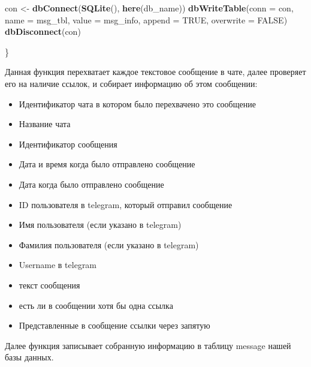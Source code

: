 \documentclass[
]{book}
\newenvironment{Shaded}{\begin{snugshade}}{\end{snugshade}}
\newcommand{\AttributeTok}[1]{\textcolor[rgb]{0.13,0.29,0.53}{#1}}
\newcommand{\ConstantTok}[1]{\textcolor[rgb]{0.56,0.35,0.01}{#1}}
\newcommand{\FunctionTok}[1]{\textcolor[rgb]{0.13,0.29,0.53}{\textbf{#1}}}
\newcommand{\NormalTok}[1]{#1}
\newcommand{\OtherTok}[1]{\textcolor[rgb]{0.56,0.35,0.01}{#1}}
\providecommand{\tightlist}{%
  \setlength{\itemsep}{0pt}\setlength{\parskip}{0pt}}
\begin{document}
\begin{Shaded}
\begin{Highlighting}[]
\NormalTok{  con }\OtherTok{\textless{}{-}} \FunctionTok{dbConnect}\NormalTok{(}\FunctionTok{SQLite}\NormalTok{(), }\FunctionTok{here}\NormalTok{(db\_name))}
  \FunctionTok{dbWriteTable}\NormalTok{(}\AttributeTok{conn =}\NormalTok{ con, }\AttributeTok{name =}\NormalTok{ msg\_tbl, }\AttributeTok{value =}\NormalTok{ msg\_info, }\AttributeTok{append =} \ConstantTok{TRUE}\NormalTok{, }\AttributeTok{overwrite =} \ConstantTok{FALSE}\NormalTok{)}
  \FunctionTok{dbDisconnect}\NormalTok{(con)}
  
\NormalTok{\}}
\end{Highlighting}
\end{Shaded}

Данная функция перехватает каждое текстовое сообщение в чате, далее проверяет его на наличие ссылок, и собирает информацию об этом сообщении:

\begin{itemize}
\tightlist
\item
  Идентификатор чата в котором было перехвачено это сообщение
\item
  Название чата
\item
  Идентификатор сообщения
\item
  Дата и время когда было отправлено сообщение
\item
  Дата когда было отправлено сообщение
\item
  ID пользователя в telegram, который отправил сообщение
\item
  Имя пользователя (если указано в telegram)
\item
  Фамилия пользователя (если указано в telegram)
\item
  Username в telegram
\item
  текст сообщения
\item
  есть ли в сообщении хотя бы одна ссылка
\item
  Представленные в сообщение ссылки через запятую
\end{itemize}

Далее функция записывает собранную информацию в таблицу message нашей базы данных.
\end{document}
